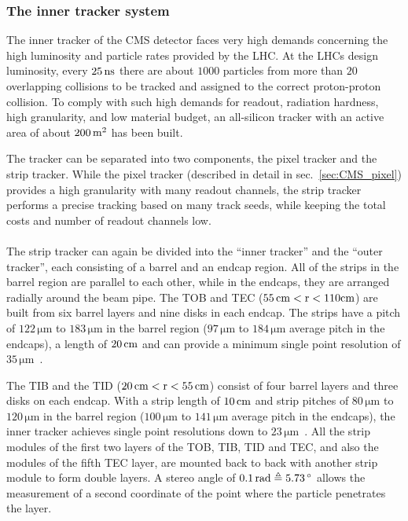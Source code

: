 \subsubsection{The inner tracker system}\label{sec:CMS_tracker}
The inner tracker of the \ac{CMS} detector faces very high demands concerning the high luminosity and particle rates provided by the \ac{LHC}. At the \ac{LHC}s design luminosity, every $25\,\rm{ns}$ there are about $1000$ particles from more than $20$ overlapping collisions to be tracked and assigned to the correct proton-proton collision. To comply with such high demands for readout, radiation hardness, high granularity, and low material budget, an all-silicon tracker with an active area of about $200\,\rm{m^2}$ has been built.

The tracker can be separated into two components, the pixel tracker and the strip tracker. While the pixel tracker (described in detail in sec.~\ref{sec:CMS_pixel}) provides a high granularity with many readout channels, the strip tracker performs a precise tracking based on many track seeds, while keeping the total costs and number of readout channels low.\\
\\The strip tracker can again be divided into the ``inner tracker'' and the ``outer tracker'', each consisting of a barrel and an endcap region. All of the strips in the barrel region are parallel to each other, while in the endcaps, they are arranged radially around the beam pipe. The \ac{TOB} and \ac{TEC} ($55\,\rm{cm}< r <110\rm{cm}$) are built from six barrel layers and nine disks in each endcap. The strips have a pitch of $122\,\si{\micro \meter}$ to $183\,\si{\micro \meter}$ in the barrel region ($97\,\si{\micro \meter}$ to $184\,\si{\micro \meter}$ average pitch in the endcaps), a length of $20\,\rm{cm}$ and can provide a minimum single point resolution of $35\,\si{\micro \meter}$~\cite{C+08}.

The \ac{TIB} and the \ac{TID} ($20\,\rm{cm}<r<55\,\rm{cm}$) consist of four barrel layers and three disks on each endcap. With a strip length of $10\,\rm{cm}$ and strip pitches of $80\,\si{\micro \meter}$ to $120\,\si{\micro \meter}$ in the barrel region ($100\,\si{\micro \meter}$ to $141\,\si{\micro \meter}$ average pitch in the endcaps), the inner tracker achieves single point resolutions down to $23\,\si{\micro \meter}$~\cite{C+08}. All the strip modules of the first two layers of the \ac{TOB}, \ac{TIB}, \ac{TID} and \ac{TEC}, and also the modules of the fifth \ac{TEC} layer, are mounted back to back with another strip module to form double layers. A stereo angle of $0.1\,\rm{rad}\triangleq 5.73\,^{\circ}$ allows the measurement of a second coordinate of the point where the particle penetrates the layer.

